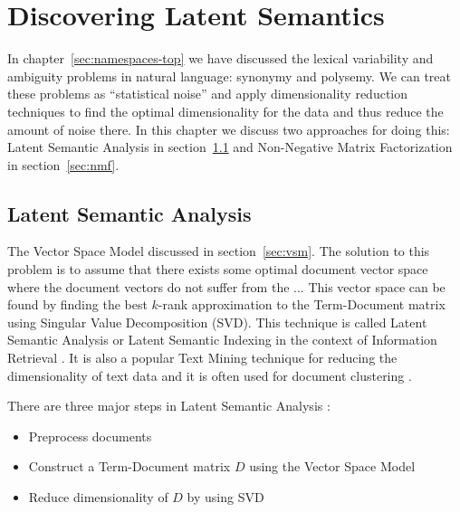 \section{Discovering Latent Semantics} \label{sec:latent-semantics}
In chapter~\ref{sec:namespaces-top} we have discussed the
lexical variability and ambiguity problems in natural language: synonymy
and polysemy. We can treat these problems as ``statistical noise'' and
apply dimensionality reduction techniques to find the optimal dimensionality
for the data and thus reduce the amount of noise there.
In this chapter we discuss two approaches for doing this:
Latent Semantic Analysis in section~\ref{sec:lsa}
and Non-Negative Matrix Factorization in section~\ref{sec:nmf}.





\subsection{Latent Semantic Analysis} \label{sec:lsa}

The Vector Space Model discussed in section~\ref{sec:vsm}.
The solution to this problem is to assume that there exists
some optimal document vector space where the document vectors
do not suffer from the ...
This vector space can be found by finding the best $k$-rank approximation
to the Term-Document matrix using Singular Value Decomposition (SVD).
This technique is called Latent Semantic Analysis \cite{landauer1998introduction}
or Latent Semantic Indexing in the context of Information Retrieval
\cite{deerwester1990indexing}.
It is also a popular Text Mining technique for reducing the dimensionality
of text data and it is often used for
document clustering \cite{aggarwal2012survey} \cite{osinski2004lingo}.


There are three major steps in Latent Semantic Analysis  \cite{evangelopoulos2012latent}:

\begin{itemize}
\itemsep1pt\parskip0pt
\item
  Preprocess documents
\item
  Construct a Term-Document matrix $D$ using the Vector Space Model
\item
  Reduce dimensionality of $D$ by using SVD
\end{itemize}


